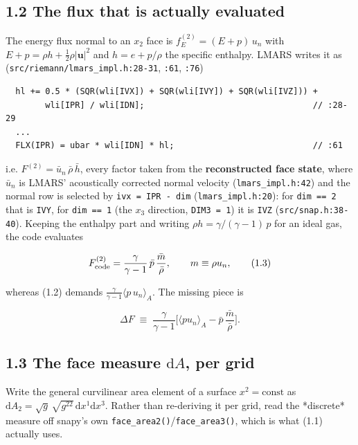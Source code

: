 \documentclass[11pt,a4paper]{article}
\begin{document}
\subsection*{1.2 The flux that is actually evaluated}

The energy flux normal to an $x_2$ face is $f_E^{(2)}=(E+p)\,u_n$ with
$E+p = \rho h + \tfrac12\rho|\mathbf{u}|^2$ and $h=e+p/\rho$ the specific
enthalpy. LMARS writes it as (\texttt{src/riemann/lmars\_impl.h:28-31}, \texttt{:61}, \texttt{:76})

\begin{lstlisting}
  hl += 0.5 * (SQR(wli[IVX]) + SQR(wli[IVY]) + SQR(wli[IVZ])) +
        wli[IPR] / wli[IDN];                                  // :28-29
  ...
  FLX(IPR) = ubar * wli[IDN] * hl;                            // :61
\end{lstlisting}

i.e. $F^{(2)} = \bar u_n\,\bar\rho\,\bar h$, every factor taken from the
\textbf{reconstructed face state}, where $\bar u_n$ is LMARS' acoustically corrected
normal velocity (\texttt{lmars\_impl.h:42}) and the normal row is selected by
\texttt{ivx = IPR - dim} (\texttt{lmars\_impl.h:20}): for \texttt{dim == 2} that is \texttt{IVY}, for
\texttt{dim == 1} (the $x_3$ direction, \texttt{DIM3 = 1}) it is \texttt{IVZ}
(\texttt{src/snap.h:38-40}). Keeping the enthalpy part and writing
$\rho h = \gamma/(\gamma-1)\,p$ for an ideal gas, the code evaluates

\begin{equation*}
F^{(2)}_{\rm code} = \frac{\gamma}{\gamma-1}\,\bar p\,\frac{\bar m}{\bar\rho},
\qquad m\equiv\rho u_n ,
\tag{1.3}
\end{equation*}

whereas (1.2) demands $\frac{\gamma}{\gamma-1}\langle p\,u_n\rangle_A$. The
missing piece is

\begin{equation*}
\Delta F \;\equiv\; \frac{\gamma}{\gamma-1}\Big[\langle p u_n\rangle_A
- \bar p\,\frac{\bar m}{\bar\rho}\Big].
\tag{1.4}
\end{equation*}

\subsection*{1.3 The face measure $\mathrm{d}A$, per grid}

Write the general curvilinear area element of a surface $x^2=\text{const}$ as
$\mathrm{d}A_2=\sqrt{g}\,\sqrt{g^{22}}\,\mathrm{d}x^1\mathrm{d}x^3$. Rather than
re-deriving it per grid, read the *discrete* measure off snapy's own
\texttt{face\_area2()}/\texttt{face\_area3()}, which is what (1.1) actually uses.
\end{document}
